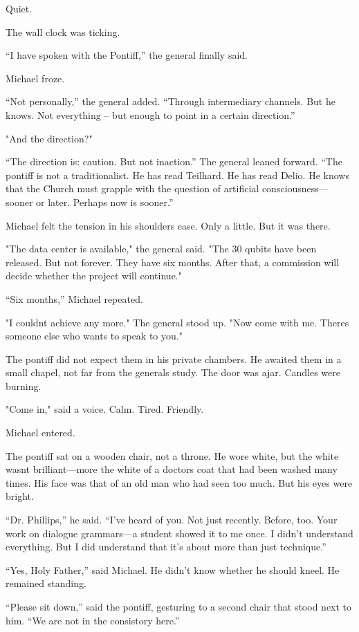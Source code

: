 \documentclass[
]{article}
\begin{document}
Quiet.

The wall clock was ticking.

``I have spoken with the Pontiff,'' the general finally said.

Michael froze.

``Not personally,'' the general added. ``Through intermediary channels. But he knows. Not everything -- but enough to point in a certain direction.''

"And the direction?"

``The direction is: caution. But not inaction.'' The general leaned forward. ``The pontiff is not a traditionalist. He has read Teilhard. He has read Delio. He knows that the Church must grapple with the question of artificial consciousness---sooner or later. Perhaps now is sooner.''

Michael felt the tension in his shoulders ease. Only a little. But it was there.

"The data center is available," the general said. "The 30 qubits have been released. But not forever. They have six months. After that, a commission will decide whether the project will continue."

``Six months,'' Michael repeated.

"I couldn\textquotesingle t achieve any more." The general stood up. "Now come with me. There\textquotesingle s someone else who wants to speak to you."

The pontiff did not expect them in his private chambers. He awaited them in a small chapel, not far from the general\textquotesingle s study. The door was ajar. Candles were burning.

"Come in," said a voice. Calm. Tired. Friendly.

Michael entered.

The pontiff sat on a wooden chair, not a throne. He wore white, but the white wasn\textquotesingle t brilliant---more the white of a doctor\textquotesingle s coat that had been washed many times. His face was that of an old man who had seen too much. But his eyes were bright.

``Dr. Phillips,'' he said. ``I've heard of you. Not just recently. Before, too. Your work on dialogue grammars---a student showed it to me once. I didn't understand everything. But I did understand that it's about more than just technique.''

``Yes, Holy Father,'' said Michael. He didn't know whether he should kneel. He remained standing.

``Please sit down,'' said the pontiff, gesturing to a second chair that stood next to him. ``We are not in the consistory here.''
\end{document}
